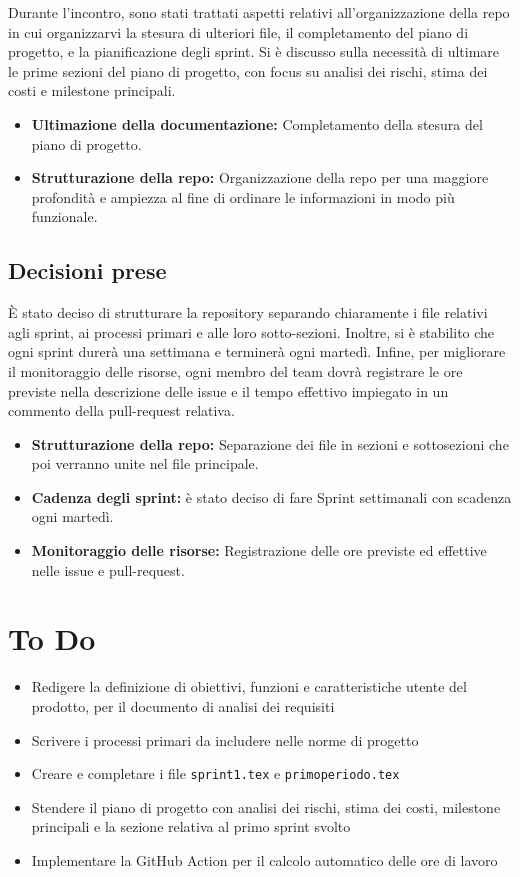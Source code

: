 \documentclass[a4paper, 12pt]{article}
\begin{document}
Durante l'incontro, sono stati trattati aspetti relativi all'organizzazione della repo in cui organizzarvi la stesura di ulteriori file, il completamento del piano di progetto, e la pianificazione degli sprint. 
Si è discusso sulla necessità di ultimare le prime sezioni del piano di progetto, con focus su analisi dei rischi, stima dei costi e milestone principali.

\begin{itemize}
    \item \textbf{Ultimazione della documentazione:} Completamento della stesura del piano di progetto.
    \item \textbf{Strutturazione della repo:} Organizzazione della repo per una maggiore profondità e ampiezza al fine di ordinare le informazioni in modo più funzionale.
\end{itemize}

\subsection{Decisioni prese}

È stato deciso di strutturare la repository separando chiaramente i file relativi agli sprint, ai processi primari e alle loro sotto-sezioni. Inoltre, si è stabilito che ogni sprint durerà una settimana e terminerà ogni martedì. Infine, per migliorare il monitoraggio delle risorse, ogni membro del team dovrà registrare le ore previste nella descrizione delle issue e il tempo effettivo impiegato in un commento della pull-request relativa.

\begin{itemize}
    \item \textbf{Strutturazione della repo:} Separazione dei file in sezioni e sottosezioni che poi verranno unite nel file principale.
    \item \textbf{Cadenza degli sprint:} è stato deciso di fare Sprint settimanali con scadenza ogni martedì.
    \item \textbf{Monitoraggio delle risorse:} Registrazione delle ore previste ed effettive nelle issue e pull-request.
\end{itemize}

\section{To Do}
\begin{itemize}
    \item Redigere la definizione di obiettivi, funzioni e caratteristiche utente del prodotto, per il documento di analisi dei requisiti
    \item Scrivere i processi primari da includere nelle norme di progetto
    \item Creare e completare i file \texttt{sprint1.tex} e \texttt{primoperiodo.tex}
    \item Stendere il piano di progetto con analisi dei rischi, stima dei costi, milestone principali e la sezione relativa al primo sprint svolto
    \item Implementare la GitHub Action per il calcolo automatico delle ore di lavoro
\end{itemize}
\end{document}
